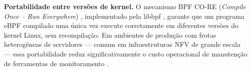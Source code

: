 \textbf{Portabilidade entre versões de kernel.}
O mecanismo BPF CO-RE (\textit{Compile Once -- Run Everywhere}) \cite{nakryiko2020},
implementado pela libbpf \cite{libbpf}, garante que um programa eBPF compilado
uma única vez execute corretamente em diferentes versões do kernel Linux, sem
recompilação.
Em ambientes de produção com frotas heterogêneas de servidores --- comum em
infraestruturas NFV de grande escala --- essa portabilidade reduz significativamente
o custo operacional de manutenção de ferramentas de monitoramento \cite{etsi2014}.
